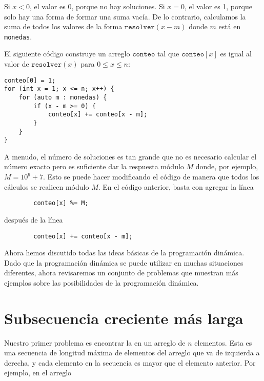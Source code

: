 Si $x<0$, el valor es 0, porque no hay soluciones.
Si $x=0$, el valor es 1, porque solo hay una forma
de formar una suma vacía.
De lo contrario, calculamos la suma de todos los valores
de la forma $\texttt{resolver}(x-m)$ donde $m$ está en \texttt{monedas}.

El siguiente código construye un arreglo
$\texttt{conteo}$ tal que
$\texttt{conteo}[x]$ es igual
al valor de $\texttt{resolver}(x)$
para $0 \le x \le n$:

\begin{lstlisting}
conteo[0] = 1;
for (int x = 1; x <= n; x++) {
    for (auto m : monedas) {
        if (x - m >= 0) {
            conteo[x] += conteo[x - m];
        }
    }
}
\end{lstlisting}

A menudo, el número de soluciones es tan grande
que no es necesario calcular el número exacto
pero es suficiente dar la respuesta módulo $M$
donde, por ejemplo, $M=10^9+7$.
Esto se puede hacer modificando el código de manera que
todos los cálculos se realicen módulo $M$.
En el código anterior, basta con agregar la línea
\begin{lstlisting}
        conteo[x] %= M;
\end{lstlisting}
después de la línea
\begin{lstlisting}
        conteo[x] += conteo[x - m];
\end{lstlisting}

Ahora hemos discutido todas las ideas básicas
de la programación dinámica.
Dado que la programación dinámica se puede utilizar
en muchas situaciones diferentes,
ahora revisaremos un conjunto de problemas
que muestran más ejemplos sobre las
posibilidades de la programación dinámica.

\section{Subsecuencia creciente más larga}


Nuestro primer problema es encontrar la
en un arreglo de $n$ elementos.
Esta es una secuencia de longitud máxima
de elementos del arreglo
que va de izquierda a derecha,
y cada elemento en la secuencia es mayor
que el elemento anterior.
Por ejemplo, en el arreglo

